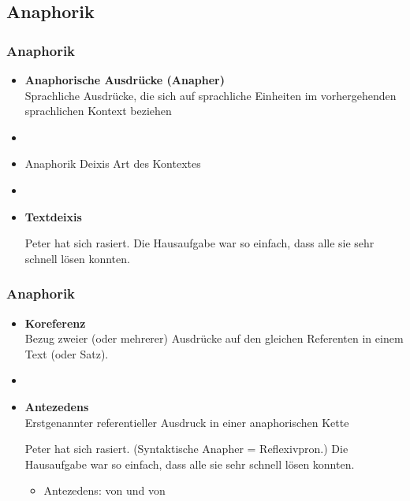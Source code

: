 %
\subsection{Anaphorik}
%

\begin{frame}
\frametitle{Anaphorik}

\begin{itemize}
	\item \textbf{Anaphorische Ausdrücke (Anapher)}\\
Sprachliche Ausdrücke, die sich auf sprachliche Einheiten im vorhergehenden sprachlichen Kontext beziehen
	\item[]
	\item Anaphorik \vs Deixis \ras Art des Kontextes
	\item[]	
	\item \textbf{Textdeixis}
	
	\eal 
	\ex Peter hat sich rasiert.
	\ex Die Hausaufgabe war so einfach, dass alle sie sehr schnell lösen konnten.
	\zl
	
\end{itemize}
	
\end{frame}



\begin{frame}
\frametitle{Anaphorik}

\begin{itemize}
	\item \textbf{Koreferenz}\\
Bezug zweier (oder mehrerer) Ausdrücke auf den gleichen Referenten in einem Text (oder Satz).
	\item[]
	\item \textbf{Antezedens} \\
Erstgenannter referentieller Ausdruck in einer anaphorischen Kette
		
		\eal 
		\ex Peter hat sich rasiert. (Syntaktische Anapher = Reflexivpron.)
		\ex Die Hausaufgabe war so einfach, dass alle sie sehr schnell lösen konnten.
		\zl
		
		\begin{itemize}
			\item Antezedens:  von  und  von 
		\end{itemize}
	
\end{itemize}

\end{frame}


